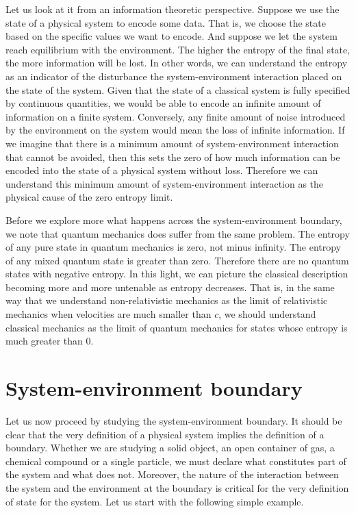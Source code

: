 \documentclass[10pt,twocolumn, nofootinbib]{revtex4-2}
\begin{document}
Let us look at it from an information theoretic perspective. Suppose we use the state of a physical system to encode some data. That is, we choose the state based on the specific values we want to encode. And suppose we let the system reach equilibrium with the environment. The higher the entropy of the final state, the more information will be lost. In other words, we can understand the entropy as an indicator of the disturbance the system-environment interaction placed on the state of the system. Given that the state of a classical system is fully specified by continuous quantities, we would be able to encode an infinite amount of information on a finite system. Conversely, any finite amount of noise introduced by the environment on the system would mean the loss of infinite information. If we imagine that there is a minimum amount of system-environment interaction that cannot be avoided, then this sets the zero of how much information can be encoded into the state of a physical system without loss. Therefore we can understand this minimum amount of system-environment interaction as the physical cause of the zero entropy limit.

Before we explore more what happens across the system-environment boundary, we note that quantum mechanics does suffer from the same problem. The entropy of any pure state in quantum mechanics is zero, not minus infinity. The entropy of any mixed quantum state is greater than zero. Therefore there are no quantum states with negative entropy. In this light, we can picture the classical description becoming more and more untenable as entropy decreases. That is, in the same way that we understand non-relativistic mechanics as the limit of relativistic mechanics when velocities are much smaller than $c$, we should understand classical mechanics as the limit of quantum mechanics for states whose entropy is much greater than $0$.

\section{System-environment boundary}

Let us now proceed by studying the system-environment boundary. It should be clear that the very definition of a physical system implies the definition of a boundary. Whether we are studying a solid object, an open container of gas, a chemical compound or a single particle, we must declare what constitutes part of the system and what does not. Moreover, the nature of the interaction between the system and the environment at the boundary is critical for the very definition of state for the system. Let us start with the following simple example.
\end{document}
